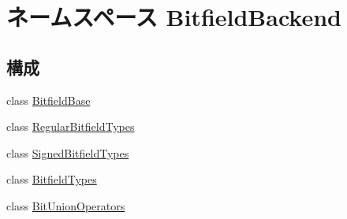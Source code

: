 \hypertarget{namespaceBitfieldBackend}{
\section{ネームスペース BitfieldBackend}
\label{namespaceBitfieldBackend}
}
\subsection*{構成}
\begin{DoxyCompactItemize}
\item 
class \hyperlink{classBitfieldBackend_1_1BitfieldBase}{BitfieldBase}
\item 
class \hyperlink{classBitfieldBackend_1_1RegularBitfieldTypes}{RegularBitfieldTypes}
\item 
class \hyperlink{classBitfieldBackend_1_1SignedBitfieldTypes}{SignedBitfieldTypes}
\item 
class \hyperlink{classBitfieldBackend_1_1BitfieldTypes}{BitfieldTypes}
\item 
class \hyperlink{classBitfieldBackend_1_1BitUnionOperators}{BitUnionOperators}
\end{DoxyCompactItemize}
